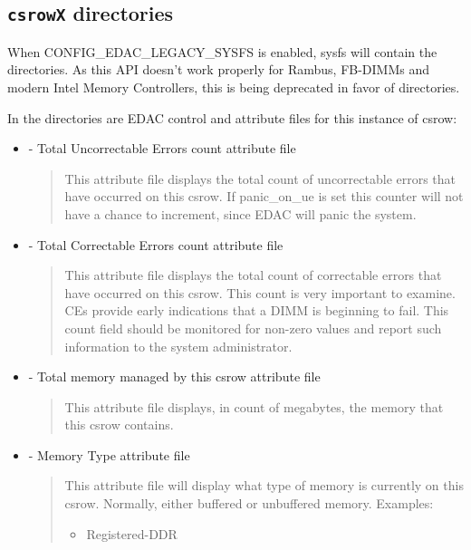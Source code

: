 \documentclass[a4paper,8pt,english]{sphinxmanual}
\begin{document}
\subsection{\texttt{csrowX} directories}
\label{admin-guide/ras:csrowx-directories}
When CONFIG\_EDAC\_LEGACY\_SYSFS is enabled, sysfs will contain the 
directories. As this API doesn't work properly for Rambus, FB-DIMMs and
modern Intel Memory Controllers, this is being deprecated in favor of
 directories.

In the  directories are EDAC control and attribute files for
this  instance of csrow:
\begin{itemize}
\item {} 
 - Total Uncorrectable Errors count attribute file
\begin{quote}

This attribute file displays the total count of uncorrectable
errors that have occurred on this csrow. If panic\_on\_ue is set
this counter will not have a chance to increment, since EDAC
will panic the system.
\end{quote}

\item {} 
 - Total Correctable Errors count attribute file
\begin{quote}

This attribute file displays the total count of correctable
errors that have occurred on this csrow. This count is very
important to examine. CEs provide early indications that a
DIMM is beginning to fail. This count field should be
monitored for non-zero values and report such information
to the system administrator.
\end{quote}

\item {} 
 - Total memory managed by this csrow attribute file
\begin{quote}

This attribute file displays, in count of megabytes, the memory
that this csrow contains.
\end{quote}

\item {} 
 - Memory Type attribute file
\begin{quote}

This attribute file will display what type of memory is currently
on this csrow. Normally, either buffered or unbuffered memory.
Examples:
\begin{itemize}
\item {} 
Registered-DDR


\end{itemize}
\end{quote}
\end{itemize}
\end{document}
